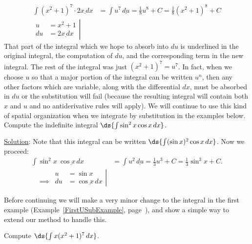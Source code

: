 \begin{align*}
\int(x^2+1)^7\cdot\underline{2x\,dx}
         &=\int u^7\,\underline{du}=\frac18u^8+C=\frac18(x^2+1)^8+C\\
\left.\begin{aligned}
u&=x^2+1\\ du&=\underline{2x\,dx}\end{aligned}\right|&\end{align*}
That part of the integral which we hope to absorb into $du$ is underlined
in the original integral, the computation of $du$, and the corresponding
term in the new integral.  The rest of the integral was just 
$(x^2+1)^7=u^7$. In fact, when we choose $u$ so that a major
portion of the integral can be written $u^n$, then any
other factors which are variable, along with the differential
$dx$, must be absorbed in $du$ or the substitution will fail
(because the resulting integral will contain both $x$ and $u$
and no antiderivative rules will apply).
We will continue to use this kind of spatial organization 
when we integrate by substitution in the examples below.
\bex Compute the indefinite integral $\ds{\int\sin^2x\cos x\,dx}$.

\underline{Solution}: Note that this integral can be written
$\ds{\int(\sin x)^2\cos x\,dx}$.  Now we proceed:
\begin{align*}
\int\sin^2x\ \underline{\cos x\,dx}&=\int u^2\,\underline{du}=\frac13u^3+C
                                          =\frac13\sin^3x+C.\\
\left.\begin{alignedat}{2}
&&u&=\sin x\\
&\implies&du&=\underline{\cos x\,dx}
\end{alignedat}\right|&\end{align*}
\eex

Before continuing we will make a very minor change to the integral
in the first example (Example~\ref{FirstUSubExample},
page~\pageref{FirstUSubExample}), 
and show a simple way to extend our method to handle this.

\bex Compute $\ds{\int x(x^2+1)^7\,dx}$.

